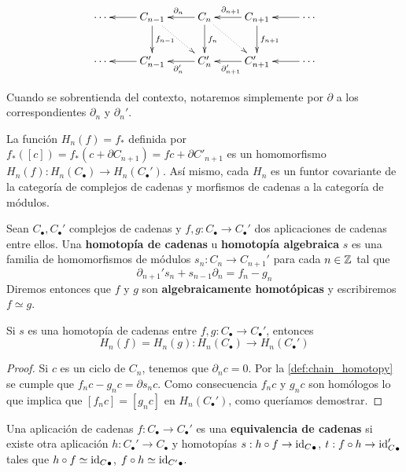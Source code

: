 \begin{equation}
	\label{chaincomplex}
	\xymatrix{
		\cdots & C_{n-1} \ar[l] \ar[d]^{f_{n-1}} \ar@{..>}[dr] & C_n \ar[l]_{\partial_{n}} \ar[d]^{f_n} \ar@{..>}[dr] & C_{n+1} \ar[l]_{\partial_{n+1}} \ar[d]^{f_{n+1}} & \cdots \ar[l] \\
		\cdots & C'_{n-1} \ar[l] & C'_n \ar[l]^{\partial'_{n}} & C'_{n+1} \ar[l]^{\partial'_{n+1}} & \cdots \ar[l]
    }
\end{equation}

Cuando se sobrentienda del contexto, notaremos simplemente por $\partial$ a los correspondientes $\partial_n$ y $\partial_n'$.

La función $H_n(f) = f_*$ definida por $f_*([c]) = f_*(c + \partial C_{n+1}) = fc + \partial C'_{n+1}$ es un homomorfismo $H_n(f): H_n(C_{\bullet}) \rightarrow H_n(C_{\bullet}')$. Así mismo, cada $H_n$ es un funtor covariante de la categoría de complejos de cadenas y morfismos de cadenas a la categoría de módulos.

\begin{definicion}
	\label{def:chain_homotopy}
	Sean $C_{\bullet},C_{\bullet}'$ complejos de cadenas y $f,g: C_{\bullet} \rightarrow C_{\bullet}'$ dos aplicaciones de cadenas entre ellos. Una \textbf{homotopía de cadenas} u \textbf{homotopía algebraica} $s$ es una familia de homomorfismos de módulos $s_n: C_n \rightarrow C_{n+1}'$ para cada $n \in \mathbb{Z}$ tal que
	\begin{equation}
		\partial_{n+1}'s_n + s_{n-1} \partial_n = f_n - g_n
	\end{equation}
	Diremos entonces que $f$ y $g$ son \textbf{algebraicamente homotópicas} y escribiremos $f \simeq g$.
\end{definicion}

\begin{teorema}
	\label{teo:homot-cad-misma-homologia}
	Si $s$ es una homotopía de cadenas entre $f,g: C_{\bullet} \rightarrow C_{\bullet}'$, entonces
	\[ H_n(f) = H_n(g) : H_n(C_{\bullet}) \rightarrow H_n(C_{\bullet}') \]
\end{teorema}
\begin{proof}
	Si $c$ es un ciclo de $C_n$, tenemos que $\partial_n c = 0$. Por la \autoref{def:chain_homotopy} se cumple que $f_nc-g_nc =  \partial s_n c$. Como consecuencia $f_n c$ y $g_n c$ son homólogos lo que implica que $[f_n c] = [g_n c]$ en $H_n(C_{\bullet}')$, como queríamos demostrar.
\end{proof}

\begin{definicion}
	Una aplicación de cadenas $f: C_{\bullet} \rightarrow C_{\bullet}'$ es una \textbf{equivalencia de cadenas} si existe otra aplicación $h: C_{\bullet}' \rightarrow C_{\bullet}$ y homotopías $s: h \circ f \rightarrow {\operatorname{id}_C}_{\bullet}$, $t: f \circ h \rightarrow {\operatorname{id}_C'}_{\bullet}$ tales que $h \circ f \simeq {\operatorname{id}_C}_{\bullet}$, $f \circ h \simeq {\operatorname{id}_{C'}}_{\bullet}$.
\end{definicion}

